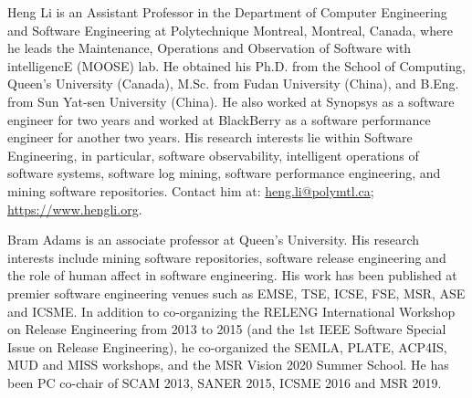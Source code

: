 \documentclass[10pt,journal,compsoc]{IEEEtran}
\begin{document}
{\begin{IEEEbiography}
{Heng Li}
is an Assistant Professor in the Department of Computer Engineering and Software Engineering at Polytechnique Montreal, Montreal, Canada, where he leads the Maintenance, Operations and Observation of Software with intelligencE (MOOSE) lab. He obtained his Ph.D. from the School of Computing, Queen's University (Canada), M.Sc. from Fudan University (China), and B.Eng. from Sun Yat-sen University (China). He also worked at Synopsys as a software engineer for two years and worked at BlackBerry as a software performance engineer for another two years. His research interests lie within Software Engineering, in particular, software observability, intelligent operations of software systems, software log mining, software performance engineering, and mining software repositories. Contact him at: \url{heng.li@polymtl.ca}; \url{https://www.hengli.org}.
\end{IEEEbiography}

\begin{IEEEbiography}
{Bram Adams}
is an associate professor at Queen’s University. His research interests include mining software   repositories, software release   engineering   and   the   role   of   human   affect   in software   engineering.   His   work   has   been   published   at   premier   software   engineering   venues such   as   EMSE,   TSE,   ICSE,   FSE,   MSR,   ASE   and   ICSME.   In   addition   to   co-organizing   the RELENG International Workshop on Release Engineering from 2013 to 2015 (and the 1st IEEE Software Special Issue on Release Engineering), he co-organized the SEMLA, PLATE, ACP4IS, MUD and MISS workshops, and the MSR Vision 2020 Summer School. He has been PC co-chair of SCAM 2013, SANER 2015, ICSME 2016 and MSR 2019.
\end{IEEEbiography}

}
\end{document}
